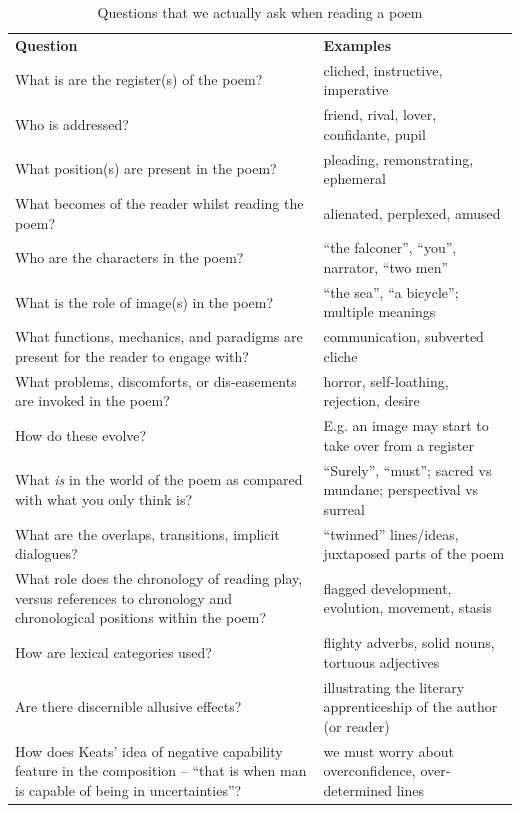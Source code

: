 \begin{table}[ht!]
{\small
\def\arraystretch{1.2}
\begin{tabular}{p{1.8in}p{1.1in}}
\textbf{Question} & \textbf{Examples} \\[.1cm]
What is are the register(s) of the poem? & cliched, instructive, imperative\\
Who is addressed? & friend, rival, lover, confidante, pupil\\
What position(s) are present in the poem? & pleading, remonstrating, ephemeral\\
What becomes of the reader whilst reading the poem? & alienated, perplexed, amused\\
Who are the characters in the poem? & ``the falconer'', ``you'', narrator, ``two men'' \\
What is the role of image(s) in the poem? & ``the sea'', ``a bicycle''; multiple meanings\\
What functions, mechanics, and paradigms are present for the reader to engage with? & communication, subverted cliche\\
What problems, discomforts, or dis-easements are invoked in the poem? & horror, self-loathing, rejection, desire \\
How do these evolve? & E.g. an image may start to take over from a register \\
What \emph{is} in the world of the poem as compared with what you only think is? & ``Surely'', ``must''; sacred vs mundane; perspectival vs surreal \\
What are the overlaps, transitions, implicit dialogues? & ``twinned'' lines/ideas, juxtaposed parts of the poem\\
What role does the chronology of reading play, versus references to chronology and chronological positions within the poem? & flagged development, evolution, movement, stasis\\
How are lexical categories used? & flighty adverbs, solid nouns, tortuous adjectives\\
Are there discernible allusive effects? & illustrating the literary apprenticeship of the author (or reader)\\
How does Keats' idea of negative capability feature in the composition -- ``that is when man is capable of being in uncertainties''? & we must worry about overconfidence, over-determined lines\\
\end{tabular}
}

\caption{Questions that we actually ask when reading a poem\label{tab:questions_for_human_readers}}
\end{table}

